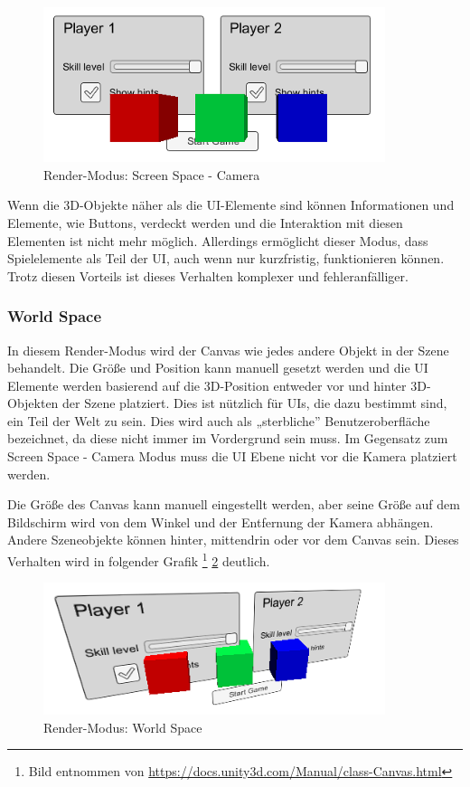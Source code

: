 			\begin{figure}[htbp]
				\centering 
				\label{renderCamera}
				\includegraphics[width=10cm]{pics/CanvasCamera.png}
				\caption{Render-Modus: Screen Space - Camera}
			\end{figure}

			Wenn die 3D-Objekte näher als die \ac{UI}-Elemente sind können Informationen und Elemente, wie Buttons, verdeckt werden und die Interaktion mit diesen Elementen ist nicht mehr möglich. Allerdings ermöglicht dieser Modus, dass Spielelemente als Teil der \ac{UI}, auch wenn nur kurzfristig, funktionieren können. Trotz diesen Vorteils ist dieses Verhalten komplexer und fehleranfälliger.

		\subsubsection{World Space}
			In diesem Render-Modus wird der Canvas wie jedes andere Objekt in der Szene behandelt. Die Größe und Position kann manuell gesetzt werden und die UI Elemente werden basierend auf die 3D-Position entweder vor und hinter 3D-Objekten der Szene platziert. Dies ist nützlich für \acp{UI}, die dazu bestimmt sind, ein Teil der Welt zu sein. Dies wird auch als „sterbliche” Benutzeroberfläche bezeichnet, da diese nicht immer im Vordergrund sein muss. Im Gegensatz zum Screen Space - Camera Modus muss die \ac{UI} Ebene nicht vor die Kamera platziert werden.

			Die Größe des Canvas kann manuell eingestellt werden, aber seine Größe auf dem Bildschirm wird von dem Winkel und der Entfernung der Kamera abhängen. Andere Szeneobjekte können hinter, mittendrin oder vor dem Canvas sein. Dieses Verhalten wird in folgender Grafik \footnote{Bild entnommen von \url{https://docs.unity3d.com/Manual/class-Canvas.html}} \ref{renderWorldSpace} deutlich.

			\begin{figure}[htbp]
				\centering 
				\label{renderWorldSpace}
				\includegraphics[width=10cm]{pics/CanvasWorldSpace.png}
				\caption{Render-Modus: World Space}
			\end{figure}
			
